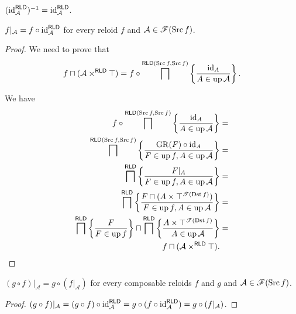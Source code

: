\begin{cor}
$(\operatorname{id}_{\mathcal{A}}^{\mathsf{RLD}})^{-1}=\operatorname{id}_{\mathcal{A}}^{\mathsf{RLD}}$.\end{cor}
\begin{thm}
$f|_{\mathcal{A}}=f\circ\operatorname{id}_{\mathcal{A}}^{\mathsf{RLD}}$ for every
reloid $f$ and $\mathcal{A}\in\mathscr{F}(\operatorname{Src} f)$.\end{thm}
\begin{proof}
We need to prove that 
\[
f\sqcap(\mathcal{A}\times^{\mathsf{RLD}}\top)=f\circ\bigsqcap^{\mathsf{RLD}(\operatorname{Src} f,\operatorname{Src} f)}\left\{ \frac{\operatorname{id}_{A}}{A\in\operatorname{up}\mathcal{A}}\right\}.
\]


We have
\begin{align*}
f\circ\bigsqcap^{\mathsf{RLD}(\operatorname{Src} f,\operatorname{Src} f)}\left\{ \frac{\operatorname{id}_{A}}{A\in\operatorname{up}\mathcal{A}}\right\} & =\\
\bigsqcap^{\mathsf{RLD}(\operatorname{Src} f,\operatorname{Src} f)}\left\{ \frac{\operatorname{GR}(F)\circ\operatorname{id}_{A}}{F\in\operatorname{up} f,A\in\operatorname{up}\mathcal{A}}\right\} & =\\
\bigsqcap^{\mathsf{RLD}}\left\{ \frac{F|_{A}}{F\in\operatorname{up} f,A\in\operatorname{up}\mathcal{A}}\right\} & =\\
\bigsqcap^{\mathsf{RLD}}\left\{ \frac{F\sqcap(A\times\top^{\mathscr{T}(\operatorname{Dst} f)})}{F\in\operatorname{up} f,A\in\operatorname{up}\mathcal{A}}\right\} & =\\
\bigsqcap^{\mathsf{RLD}}\left\{ \frac{F}{F\in\operatorname{up} f}\right\}\sqcap\bigsqcap^{\mathsf{RLD}}\left\{ \frac{A\times\top^{\mathscr{T}(\operatorname{Dst} f)}}{A\in\operatorname{up}\mathcal{A}}\right\} & =\\
f\sqcap(\mathcal{A}\times^{\mathsf{RLD}}\top).
\end{align*}
\end{proof}
\begin{thm}
$(g\circ f)|_{\mathcal{A}}=g\circ(f|_{\mathcal{A}})$ for every composable
reloids $f$ and $g$ and $\mathcal{A}\in\mathscr{F}(\operatorname{Src} f)$.\end{thm}
\begin{proof}
$(g\circ f)|_{\mathcal{A}}=(g\circ f)\circ\operatorname{id}_{\mathcal{A}}^{\mathsf{\mathsf{RLD}}}=g\circ(f\circ\operatorname{id}_{\mathcal{A}}^{\mathsf{\mathsf{RLD}}})=g\circ(f|_{\mathcal{A}})$.\end{proof}
